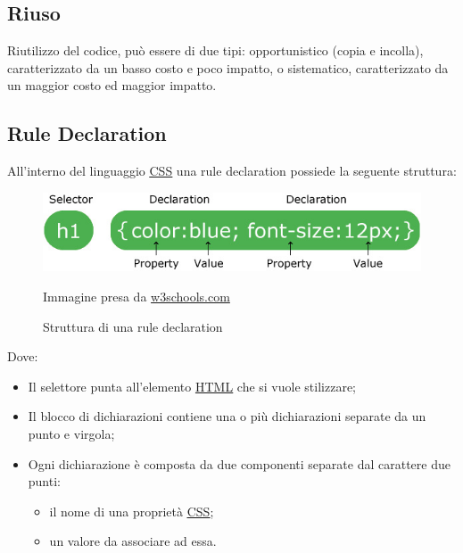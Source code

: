 	\subsection{Riuso}
	\label{sec:riuso}
	Riutilizzo del codice, può essere di due tipi: opportunistico (copia e incolla), caratterizzato da un basso costo e poco impatto, o sistematico, caratterizzato da un maggior costo ed maggior impatto.

	\subsection{Rule Declaration}
	\label{sec:ruledeclaration}
	All'interno del linguaggio \underline{\hyperref[sec:css]{CSS}} una rule declaration possiede la seguente struttura:
	\begin{figure} [H]
		\centering
		\includegraphics[scale=0.45]{Img/selector.jpg} 
		\caption{Struttura di una rule declaration} \label{}
		Immagine presa da \href{https://www.w3schools.com/css/css_syntax.asp}{w3schools.com}
		
	\end{figure}
	Dove:
	\begin{itemize}
		\item Il selettore punta all'elemento \underline{\hyperref[sec:html]{HTML}} che si vuole stilizzare;
		\item Il blocco di dichiarazioni contiene una o più dichiarazioni separate da un punto e virgola;
		\item {Ogni dichiarazione è composta da due componenti separate dal carattere due punti:
			\begin{itemize}
				\item il nome di una proprietà \underline{\hyperref[sec:css]{CSS}};
				\item un valore da associare ad essa.
			\end{itemize}
		}
	\end{itemize}
